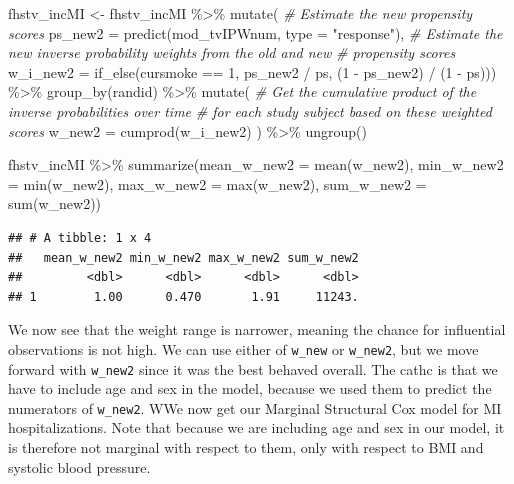 \documentclass[
]{book}
\newenvironment{Shaded}{\begin{snugshade}}{\end{snugshade}}
\newcommand{\AttributeTok}[1]{\textcolor[rgb]{0.77,0.63,0.00}{#1}}
\newcommand{\CommentTok}[1]{\textcolor[rgb]{0.56,0.35,0.01}{\textit{#1}}}
\newcommand{\DecValTok}[1]{\textcolor[rgb]{0.00,0.00,0.81}{#1}}
\newcommand{\FunctionTok}[1]{\textcolor[rgb]{0.00,0.00,0.00}{#1}}
\newcommand{\NormalTok}[1]{#1}
\newcommand{\OtherTok}[1]{\textcolor[rgb]{0.56,0.35,0.01}{#1}}
\newcommand{\SpecialCharTok}[1]{\textcolor[rgb]{0.00,0.00,0.00}{#1}}
\newcommand{\StringTok}[1]{\textcolor[rgb]{0.31,0.60,0.02}{#1}}
\begin{document}
\begin{Shaded}
\begin{Highlighting}[]
\NormalTok{fhstv\_incMI }\OtherTok{\textless{}{-}}\NormalTok{ fhstv\_incMI }\SpecialCharTok{\%\textgreater{}\%}
  \FunctionTok{mutate}\NormalTok{(}
    \CommentTok{\# Estimate the new propensity scores}
    \AttributeTok{ps\_new2 =} \FunctionTok{predict}\NormalTok{(mod\_tvIPWnum, }\AttributeTok{type =} \StringTok{"response"}\NormalTok{), }
    \CommentTok{\# Estimate the new inverse probability weights from the old and new }
    \CommentTok{\# propensity scores}
    \AttributeTok{w\_i\_new2 =} \FunctionTok{if\_else}\NormalTok{(cursmoke }\SpecialCharTok{==} \DecValTok{1}\NormalTok{, ps\_new2 }\SpecialCharTok{/}\NormalTok{ ps, (}\DecValTok{1} \SpecialCharTok{{-}}\NormalTok{ ps\_new2) }\SpecialCharTok{/}\NormalTok{ (}\DecValTok{1} \SpecialCharTok{{-}}\NormalTok{ ps))) }\SpecialCharTok{\%\textgreater{}\%} 
  \FunctionTok{group\_by}\NormalTok{(randid) }\SpecialCharTok{\%\textgreater{}\%}
  \FunctionTok{mutate}\NormalTok{(}
    \CommentTok{\# Get the cumulative product of the inverse probabilities over time}
    \CommentTok{\# for each study subject based on these weighted scores}
    \AttributeTok{w\_new2 =} \FunctionTok{cumprod}\NormalTok{(w\_i\_new2)}
\NormalTok{  ) }\SpecialCharTok{\%\textgreater{}\%} 
  \FunctionTok{ungroup}\NormalTok{()}

\NormalTok{fhstv\_incMI }\SpecialCharTok{\%\textgreater{}\%}
  \FunctionTok{summarize}\NormalTok{(}\AttributeTok{mean\_w\_new2 =} \FunctionTok{mean}\NormalTok{(w\_new2),}
            \AttributeTok{min\_w\_new2 =} \FunctionTok{min}\NormalTok{(w\_new2),}
            \AttributeTok{max\_w\_new2 =} \FunctionTok{max}\NormalTok{(w\_new2),}
            \AttributeTok{sum\_w\_new2 =} \FunctionTok{sum}\NormalTok{(w\_new2))}
\end{Highlighting}
\end{Shaded}

\begin{verbatim}
## # A tibble: 1 x 4
##   mean_w_new2 min_w_new2 max_w_new2 sum_w_new2
##         <dbl>      <dbl>      <dbl>      <dbl>
## 1        1.00      0.470       1.91     11243.
\end{verbatim}

We now see that the weight range is narrower, meaning the chance for influential observations is not high. We can use either of \texttt{w\_new} or \texttt{w\_new2}, but we move forward with \texttt{w\_new2} since it was the best behaved overall. The cathc is that we have to include age and sex in the model, because we used them to predict the numerators of \texttt{w\_new2}. WWe now get our Marginal Structural Cox model for MI hospitalizations. Note that because we are including age and sex in our model, it is therefore not marginal with respect to them, only with respect to BMI and systolic blood pressure.
\end{document}
